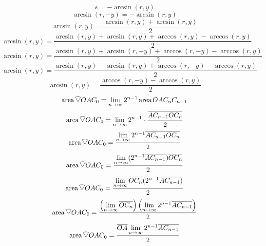 \documentclass[a4paper,12pt]{report}
\DeclareMathOperator{\area}{area}
\newcommand{\circularsector}{%
    \begin{tikzpicture}[baseline=-0.1ex, scale=0.27]
        \draw (0,0) -- (60:1) arc (60:120:1) -- cycle;
    \end{tikzpicture}%
}
\begin{document}
\begin{equation}
s = -\arcsin(r,y)
\end{equation}
\begin{equation}
\arcsin(r,-y) = -\arcsin(r,y)
\end{equation}
\begin{equation}
\arcsin(r,y) = \frac{\arcsin(r,y) + \arcsin(r,y)}{2}
\end{equation}
\begin{equation}
\arcsin(r,y) = \frac{\arcsin(r,y) + \arcsin(r,y) + \arccos(r,y) - \arccos(r,y)}{2}
\end{equation}
\begin{equation}
\arcsin(r,y) = \frac{\arcsin(r,y) + \arcsin(r,-y) + \arccos(r,-y) - \arccos(r,y)}{2}
\end{equation}
\begin{equation}
\arcsin(r,y) = \frac{\arcsin(r,y) - \arcsin(r,y) + \arccos(r,-y) - \arccos(r,y)}{2}
\end{equation}
\begin{equation}
\arcsin(r,y) = \frac{\arccos(r,-y) - \arccos(r,y)}{2}
\end{equation}
\begin{equation}
\area \circularsector OAC_0 = \lim \limits_{n \to \infty} 2^{n-1} \area OAC_nC_{n-1}
\end{equation}
\begin{equation}
\area \circularsector OAC_0 = \lim \limits_{n \to \infty} 2^{n-1} \cdot \frac{\overline{AC_{n-1}} \overline{OC_n}}{2}
\end{equation}
\begin{equation}
\area \circularsector OAC_0 = \frac{\lim \limits_{n \to \infty} 2^{n-1} \overline{AC_{n-1}} \overline{OC_n}}{2}
\end{equation}
\begin{equation}
\area \circularsector OAC_0 = \frac{\lim \limits_{n \to \infty} (2^{n-1} \overline{AC_{n-1}}) \overline{OC_n}}{2}
\end{equation}
\begin{equation}
\area \circularsector OAC_0 = \frac{\lim \limits_{n \to \infty} \overline{OC_n} (2^{n-1} \overline{AC_{n-1}})}{2}
\end{equation}
\begin{equation}
\area \circularsector OAC_0 = \frac{\left(\lim \limits_{n \to \infty} \overline{OC_n}\right) \left(\lim \limits_{n \to \infty} 2^{n-1} \overline{AC_{n-1}}\right)}{2}
\end{equation}
\begin{equation}
\area \circularsector OAC_0 = \frac{\overline{OA} \lim \limits_{n \to \infty} 2^{n-1} \overline{AC_{n-1}}}{2}
\end{equation}
\end{document}
